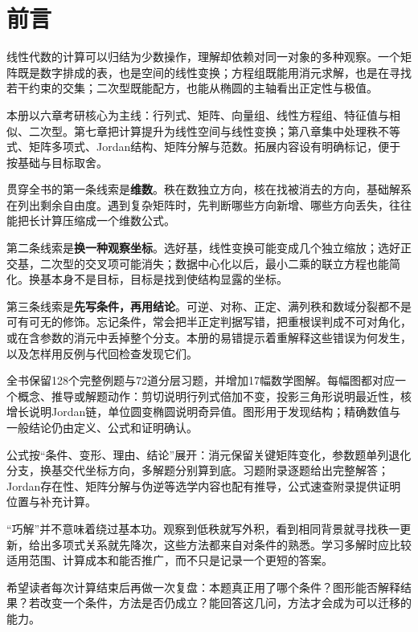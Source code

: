 \chapter*{前言}
线性代数的计算可以归结为少数操作，理解却依赖对同一对象的多种观察。一个矩阵既是数字排成的表，也是空间的线性变换；方程组既能用消元求解，也是在寻找若干约束的交集；二次型既能配方，也能从椭圆的主轴看出正定性与极值。

本册以六章考研核心为主线：行列式、矩阵、向量组、线性方程组、特征值与相似、二次型。第七章把计算提升为线性空间与线性变换；第八章集中处理秩不等式、矩阵多项式、Jordan结构、矩阵分解与范数。拓展内容设有明确标记，便于按基础与目标取舍。

贯穿全书的第一条线索是\textbf{维数}。秩在数独立方向，核在找被消去的方向，基础解系在列出剩余自由度。遇到复杂矩阵时，先判断哪些方向新增、哪些方向丢失，往往能把长计算压缩成一个维数公式。

第二条线索是\textbf{换一种观察坐标}。选好基，线性变换可能变成几个独立缩放；选好正交基，二次型的交叉项可能消失；数据中心化以后，最小二乘的联立方程也能简化。换基本身不是目标，目标是找到使结构显露的坐标。

第三条线索是\textbf{先写条件，再用结论}。可逆、对称、正定、满列秩和数域分裂都不是可有可无的修饰。忘记条件，常会把半正定判据写错，把重根误判成不可对角化，或在含参数的消元中丢掉整个分支。本册的易错提示着重解释这些错误为何发生，以及怎样用反例与代回检查发现它们。

全书保留128个完整例题与72道分层习题，并增加17幅数学图解。每幅图都对应一个概念、推导或解题动作：剪切说明行列式倍加不变，投影三角形说明最近性，核增长说明Jordan链，单位圆变椭圆说明奇异值。图形用于发现结构；精确数值与一般结论仍由定义、公式和证明确认。

公式按“条件、变形、理由、结论”展开：消元保留关键矩阵变化，参数题单列退化分支，换基交代坐标方向，多解题分别算到底。习题附录逐题给出完整解答；Jordan存在性、矩阵分解与伪逆等选学内容也配有推导，公式速查附录提供证明位置与补充计算。

“巧解”并不意味着绕过基本功。观察到低秩就写外积，看到相同背景就寻找秩一更新，给出多项式关系就先降次，这些方法都来自对条件的熟悉。学习多解时应比较适用范围、计算成本和能否推广，而不只是记录一个更短的答案。

希望读者每次计算结束后再做一次复盘：本题真正用了哪个条件？图形能否解释结果？若改变一个条件，方法是否仍成立？能回答这几问，方法才会成为可以迁移的能力。
